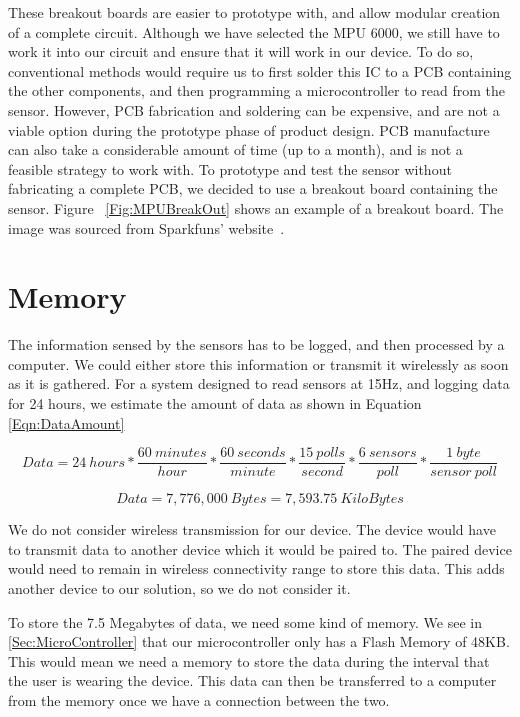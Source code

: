 These breakout boards are easier to prototype with, and allow modular creation of a complete circuit. Although we have selected the MPU 6000, we still have to work it into our circuit and ensure that it will work in our device. To do so, conventional methods would require us to first solder this IC to a PCB containing the other components, and then programming a microcontroller to read from the sensor. However, PCB fabrication and soldering can be expensive, and are not a viable option during the prototype phase of product design. PCB manufacture can also take a considerable amount of time (up to a month), and is not a feasible strategy to work with. To prototype and test the sensor without fabricating a complete PCB, we decided to use a breakout board containing the sensor. Figure ~\ref{Fig:MPUBreakOut} shows an example of a breakout board. The image was sourced from Sparkfuns' website~\cite{Web:SFBreakout}.

\section{Memory}
\label{Sec:Memory}

The information sensed by the sensors has to be logged, and then processed by a computer. We could either store this information or transmit it wirelessly as soon as it is gathered. For a system designed to read sensors at 15Hz, and logging data for 24 hours, we estimate the amount of data as shown in Equation \ref{Eqn:DataAmount}

\begin{equation}
\label{Eqn:DataAmount}
Data = 24~hours * \dfrac{60~minutes}{hour} * \dfrac{60~seconds}{minute} * \dfrac{15~polls}{second} * \dfrac{6~sensors}{poll} * \dfrac{1~byte}{sensor~poll}
\end{equation}

\begin{equation}
\label{Eqn:DataAmount2}
Data = 7,776,000~Bytes = 7,593.75~KiloBytes
\end{equation}

We do not consider wireless transmission for our device. The device would have to transmit data to another device which it would be paired to. The paired device would need to remain in wireless connectivity range to store this data. This adds another device to our solution, so we do not consider it. 

To store the 7.5 Megabytes of data, we need some kind of memory. We see in \ref{Sec:MicroController} that our microcontroller only has a Flash Memory of 48KB. This would mean we need a memory to store the data during the interval that the user is wearing the device. This data can then be transferred to a computer from the memory once we have a connection between the two.

